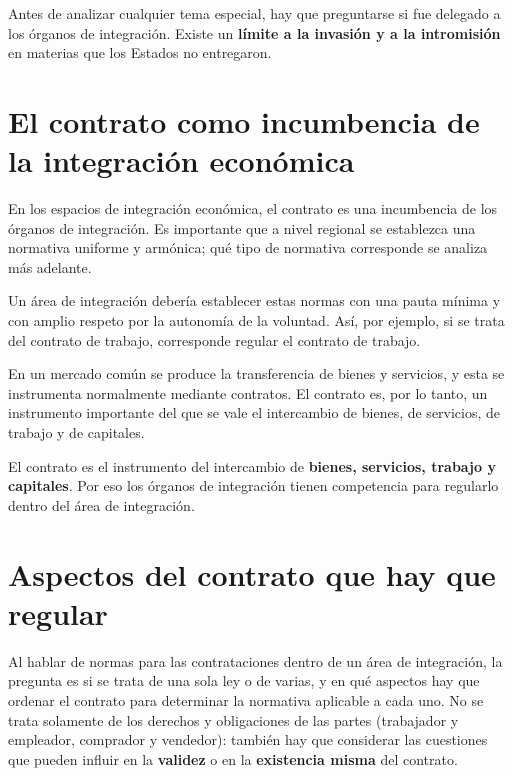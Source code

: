\documentclass[12pt,oneside]{book}
\begin{document}
\begin{important}
Antes de analizar cualquier tema especial, hay que preguntarse si fue delegado a los órganos de integración. Existe un \textbf{límite a la invasión y a la intromisión} en materias que los Estados no entregaron.
\end{important}

\section{El contrato como incumbencia de la integración económica}

En los espacios de integración económica, el contrato es una incumbencia de los órganos de integración. Es importante que a nivel regional se establezca una normativa uniforme y armónica; qué tipo de normativa corresponde se analiza más adelante.

Un área de integración debería establecer estas normas con una pauta mínima y con amplio respeto por la autonomía de la voluntad. Así, por ejemplo, si se trata del contrato de trabajo, corresponde regular el contrato de trabajo.

En un mercado común se produce la transferencia de bienes y servicios, y esta se instrumenta normalmente mediante contratos. El contrato es, por lo tanto, un instrumento importante del que se vale el intercambio de bienes, de servicios, de trabajo y de capitales.

\begin{important}
El contrato es el instrumento del intercambio de \textbf{bienes, servicios, trabajo y capitales}. Por eso los órganos de integración tienen competencia para regularlo dentro del área de integración.
\end{important}

\section{Aspectos del contrato que hay que regular}

Al hablar de normas para las contrataciones dentro de un área de integración, la pregunta es si se trata de una sola ley o de varias, y en qué aspectos hay que ordenar el contrato para determinar la normativa aplicable a cada uno. No se trata solamente de los derechos y obligaciones de las partes (trabajador y empleador, comprador y vendedor): también hay que considerar las cuestiones que pueden influir en la \textbf{validez} o en la \textbf{existencia misma} del contrato.
\end{document}
